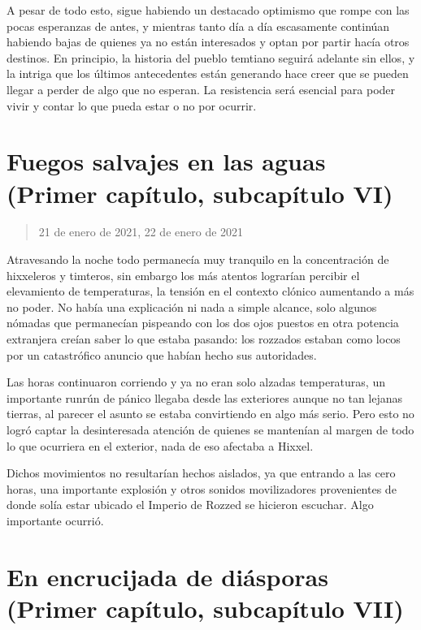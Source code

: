 \documentclass[
  spanish,
]{book}
\begin{document}
A pesar de todo esto, sigue habiendo un destacado optimismo que rompe con las pocas esperanzas de antes, y mientras tanto día a día escasamente continúan habiendo bajas de quienes ya no están interesados y optan por partir hacía otros destinos. En principio, la historia del pueblo temtiano seguirá adelante sin ellos, y la intriga que los últimos antecedentes están generando hace creer que se pueden llegar a perder de algo que no esperan. La resistencia será esencial para poder vivir y contar lo que pueda estar o no por ocurrir.

\hypertarget{fuegos-salvajes-en-las-aguas-primer-capuxedtulo-subcapuxedtulo-vi}{%
\section{Fuegos salvajes en las aguas (Primer capítulo, subcapítulo VI)}\label{fuegos-salvajes-en-las-aguas-primer-capuxedtulo-subcapuxedtulo-vi}}

\begin{quote}
21 de enero de 2021, 22 de enero de 2021
\end{quote}

Atravesando la noche todo permanecía muy tranquilo en la concentración de hixxeleros y timteros, sin embargo los más atentos lograrían percibir el elevamiento de temperaturas, la tensión en el contexto clónico aumentando a más no poder. No había una explicación ni nada a simple alcance, solo algunos nómadas que permanecían pispeando con los dos ojos puestos en otra potencia extranjera creían saber lo que estaba pasando: los rozzados estaban como locos por un catastrófico anuncio que habían hecho sus autoridades.

Las horas continuaron corriendo y ya no eran solo alzadas temperaturas, un importante runrún de pánico llegaba desde las exteriores aunque no tan lejanas tierras, al parecer el asunto se estaba convirtiendo en algo más serio. Pero esto no logró captar la desinteresada atención de quienes se mantenían al margen de todo lo que ocurriera en el exterior, nada de eso afectaba a Hixxel.

Dichos movimientos no resultarían hechos aislados, ya que entrando a las cero horas, una importante explosión y otros sonidos movilizadores provenientes de donde solía estar ubicado el Imperio de Rozzed se hicieron escuchar. Algo importante ocurrió.

\hypertarget{en-encrucijada-de-diuxe1sporas-primer-capuxedtulo-subcapuxedtulo-vii}{%
\section{En encrucijada de diásporas (Primer capítulo, subcapítulo VII)}\label{en-encrucijada-de-diuxe1sporas-primer-capuxedtulo-subcapuxedtulo-vii}}
\end{document}

